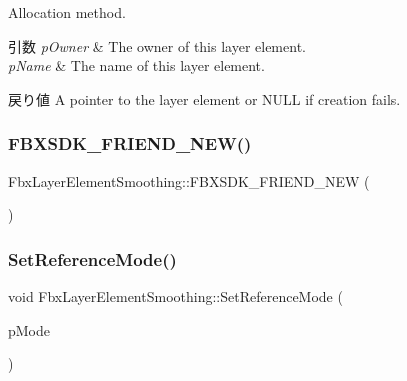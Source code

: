 Allocation method. 
\begin{DoxyParams}{引数}
{\em p\+Owner} & The owner of this layer element. \\
\hline
{\em p\+Name} & The name of this layer element. \\
\hline
\end{DoxyParams}
\begin{DoxyReturn}{戻り値}
A pointer to the layer element or {\ttfamily N\+U\+LL} if creation fails. 
\end{DoxyReturn}
\mbox{\label{class_fbx_layer_element_smoothing_aea45577e6b6315795adeaf801538b5ab}} 
\subsubsection{\texorpdfstring{F\+B\+X\+S\+D\+K\+\_\+\+F\+R\+I\+E\+N\+D\+\_\+\+N\+E\+W()}{FBXSDK\_FRIEND\_NEW()}}
{\footnotesize\ttfamily Fbx\+Layer\+Element\+Smoothing\+::\+F\+B\+X\+S\+D\+K\+\_\+\+F\+R\+I\+E\+N\+D\+\_\+\+N\+EW (\begin{DoxyParamCaption}{ }\end{DoxyParamCaption})}

\mbox{\label{class_fbx_layer_element_smoothing_a8c17c1dad55d4a42648c6f40337dd8c5}} 
\subsubsection{\texorpdfstring{Set\+Reference\+Mode()}{SetReferenceMode()}}
{\footnotesize\ttfamily void Fbx\+Layer\+Element\+Smoothing\+::\+Set\+Reference\+Mode (\begin{DoxyParamCaption}\item[{\hyperlink{class_fbx_layer_element_a00f04654580ca9b2f5d292c11abd83fc}{Fbx\+Layer\+Element\+::\+E\+Reference\+Mode}}]{p\+Mode }\end{DoxyParamCaption})}

